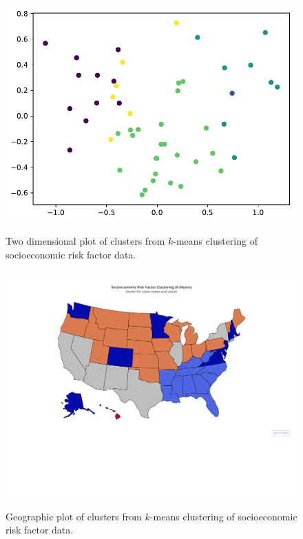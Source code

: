 \documentclass{article}
\begin{document}
\begin{figure}[h]
\centering
\caption{Two dimensional plot of clusters from $k$-means clustering of socioeconomic risk factor data.}
\includegraphics[width=\linewidth]{images/socioeconomic_risk_factors_kmeans_2d_plot.pdf}
\label{fig:kmeanssocioscat}
\end{figure}

\begin{figure}[h]
\centering
\caption{Geographic plot of clusters from $k$-means clustering of socioeconomic risk factor data.}
\includegraphics[width=\linewidth]{images/socioeconomic_risk_factor_kmeans_map.pdf}
\label{fig:kmeanssociomap}
\end{figure}
\end{document}
